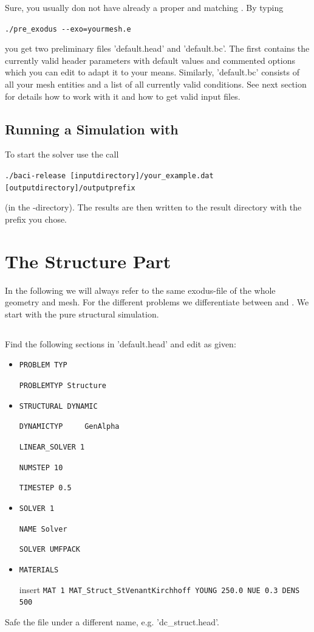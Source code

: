 Sure, you usually don not have already a proper \head and matching \bc. By
typing
\begin{center}
  \verb|./pre_exodus --exo=yourmesh.e|
\end{center}
you get two preliminary files
'default.head' and 'default.bc'. The first contains the currently valid header
parameters with default values and commented options which you can edit to
adapt it to your means. Similarly, 'default.bc' consists of all your mesh
entities and a list of all currently valid conditions. See next section for
details how to work with it and how to get valid input files.

\subsection{Running a Simulation with \baci{}}
\label{tut_fsi_preexo:baci}
To start the solver use the call
\begin{center}
	\verb|./baci-release [inputdirectory]/your_example.dat [outputdirectory]/outputprefix|
\end{center}
(in the \baci{}-directory). The results are then written to
the result directory with the prefix you chose.

\section{The Structure Part}

In the following we will always refer to the same exodus-file of the whole
geometry and mesh. For the different problems we differentiate between \head and
\bc. We start with the pure structural simulation.

\subsection{\head}
Find the following sections in 'default.head' and edit as given:

\begin{itemize}
 \item \verb|PROBLEM TYP|

 \verb|PROBLEMTYP Structure|

 \item \verb|STRUCTURAL DYNAMIC|

 \verb|DYNAMICTYP     GenAlpha|

 \verb|LINEAR_SOLVER 1|

 \verb|NUMSTEP 10|

 \verb|TIMESTEP 0.5|

 \item \verb|SOLVER 1|

 \verb|NAME Solver|

 \verb|SOLVER UMFPACK|

 \item \verb|MATERIALS|

  insert \verb|MAT 1 MAT_Struct_StVenantKirchhoff YOUNG 250.0 NUE 0.3 DENS 500|

\end{itemize}
Safe the file under a different name, e.g. 'dc\_struct.head'.


